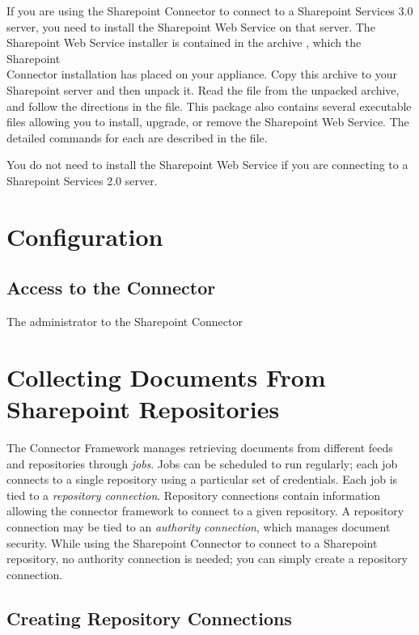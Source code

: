 \begin{changemargin}{1.5in}{0in}
If you are using the Sharepoint Connector to connect
to a Sharepoint Services 3.0 server, you need to
install the Sharepoint Web Service on that server. The
Sharepoint Web Service installer is contained in the archive
,
which the Sharepoint\\ Connector installation has placed on your
appliance. Copy this archive to your Sharepoint server and then unpack
it. Read the file   from the
unpacked archive, and follow the directions in the file. This package
also contains several executable files allowing you to install, upgrade,
or remove the Sharepoint Web Service. The detailed commands for each
are described in the   file.

You do not need to install the Sharepoint Web Service if you are
connecting to a Sharepoint Services 2.0 server.

\section{Configuration}

\subsection{Access to the Connector}

The administrator to the Sharepoint Connector 

\section{Collecting Documents From Sharepoint Repositories} %

The Connector Framework manages retrieving documents from different
feeds and repositories through \emph{jobs}. Jobs can be scheduled to
run regularly; each job connects to a single repository using a
particular set of credentials. Each job is tied to a \emph{repository
connection}. Repository connections contain information allowing the
connector framework to connect to a given repository. A repository
connection may be tied to an \emph{authority connection}, which
manages document security. While using the Sharepoint Connector to
connect to a Sharepoint repository, no authority connection is needed;
you can simply create a repository connection.


\subsection{Creating Repository Connections}


\end{changemargin}

